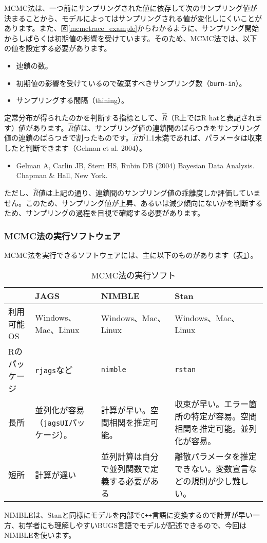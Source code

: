 MCMC法は、一つ前にサンプリングされた値に依存して次のサンプリング値が決まることから、モデルによってはサンプリングされる値が変化しにくいことがあります。また、図\ref{mcmctrace_example}からわかるように、サンプリング開始からしばらくは初期値の影響を受けています。そのため、MCMC法では、以下の値を設定する必要があります。
\begin{itemize}
	\item 連鎖の数。
	\item 初期値の影響を受けているので破棄すべきサンプリング数（\verb|burn-in|）。
	\item サンプリングする間隔（thining）。
\end{itemize}

定常分布が得られたのかを判断する指標として、$\hat{R}$（R上ではR hatと表記されます）値があります。$\hat{R}$値は、サンプリング値の連鎖間のばらつきをサンプリング値の連鎖のばらつきで割ったものです。$\hat{R}$が1.1未満であれば、パラメータは収束したと判断できます（Gelman et al. 2004）。
\begin{itemize}
\item Gelman A, Carlin JB, Stern HS, Rubin DB (2004) Bayesian Data Analysis. Chapman \& Hall, New York.
\end{itemize}
ただし、$\hat{R}$値は上記の通り、連鎖間のサンプリング値の乖離度しか評価していません。このため、サンプリング値が上昇、あるいは減少傾向にないかを判断するため、サンプリングの過程を目視で確認する必要があります。

		\subsubsection{MCMC法の実行ソフトウェア}
MCMC法を実行できるソフトウェアには、主に以下のものがあります（表\ref{software}）。
\begin{table}
\begin{center}
\caption{MCMC法の実行ソフト}
\label{software}
\begin{tabularx}{\textwidth}{lXXX} \toprule
 & \index{JAGS@JAGS}JAGS & \index{NIMBLE@NIMBLE}NIMBLE & \index{Stan@Stan}Stan \\ \midrule
 利用可能OS &  Windows、Mac、Linux &  Windows、Mac、Linux & Windows、Mac、Linux \\ 
 Rのパッケージ & \verb|rjags|など & \verb|nimble| & \verb|rstan| \\
 長所 & 並列化が容易（\verb|jagsUI|パッケージ）。 & 計算が早い。空間相関を推定可能。 & 収束が早い。エラー箇所の特定が容易。空間相関を推定可能。並列化が容易。 \\ 
 短所 & 計算が遅い & 並列計算は自分で並列関数で定義する必要がある & 離散パラメータを推定できない。変数宣言などの規則が少し難しい。 \\ \bottomrule
\end{tabularx}
\end{center}
\end{table}
NIMBLEは、Stanと同様にモデルを内部で\verb|C++|言語に変換するので計算が早い一方、初学者にも理解しやすいBUGS言語でモデルが記述できるので、今回はNIMBLEを使います。

